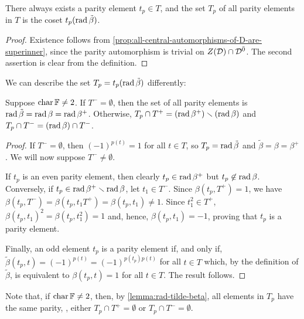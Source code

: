 \begin{cor}\label{cor:existence-parity-element}
    There always exists a parity element $t_p \in T$, and 
    the set $T_p$ of all parity elements in $T$ is the coset $t_p (\operatorname{rad} \tilde\beta)$. 
\end{cor}

\begin{proof}
    Existence follows from \cref{prop:all-central-automorphisms-of-D-are-superinner}, since the parity automorphism is trivial on $Z(\mathcal{D}) \cap \mathcal{D}^{\bar0}$. 
    The second assertion is clear from the definition. 
\end{proof}

We can describe the set $T_p = t_p (\operatorname{rad} \tilde\beta)$ differently: 

\begin{lemma}\label{lemma:set-parity-elements}
    Suppose $\operatorname{char} \mathbb{F} \neq 2$. 
    If $T^- =\emptyset$, then the set of all parity elements is $\operatorname{rad} \tilde\beta = \operatorname{rad} \beta = \operatorname{rad} \beta^+$. 
    Otherwise, $T_p \cap T^+ = (\operatorname{rad} \beta^+) \smallsetminus (\operatorname{rad}\beta)$ and $T_p \cap T^- = (\operatorname{rad} \beta) \cap T^-$. 
\end{lemma}

\begin{proof}
    If $T^- =\emptyset$, then $(-1)^{p(t)} = 1$ for all $t\in T$, so $T_p = \operatorname{rad} \tilde\beta$ and $\tilde\beta = \beta = \beta^+$. 
    We will now suppose $T^- \neq\emptyset$.
    
    If $t_p$ is an even parity element, then clearly $t_p \in \operatorname{rad}\beta^+$ but $t_p \not\in \operatorname{rad} \beta$. 
    Conversely, if $t_p \in \operatorname{rad} \beta^+ \smallsetminus \operatorname{rad}\beta$, let $t_1\in T^-$. 
    Since $\beta(t_p, T^+) = 1$, we have $\beta(t_p, T^-) = \beta(t_p, t_1 T^+) = \beta(t_p, t_1) \neq 1$. 
    Since $t_1^2 \in T^+$, $\beta(t_p, t_1)^2 = \beta(t_p, t_1^2) = 1$ and, hence, $\beta(t_p, t_1) = - 1$, proving that $t_p$ is a parity element. 
    
    Finally, an odd element $t_p$ is a parity element if, and only if, $\tilde\beta(t_p, t) = (-1)^{p(t)} = (-1)^{p(t_p) p(t)}$ for all $t\in T$ which, by the definition of $\tilde\beta$, is equivalent to $\beta(t_p, t) = 1$ for all $t\in T$. 
    The result follows. 
\end{proof} 

Note that, if $\operatorname{char} \mathbb{F} \neq 2$, then, by \cref{lemma:rad-tilde-beta}, all elements in $T_p$ have the same parity, \ie, either $T_p \cap T^+ = \emptyset$ or $T_p \cap T^- = \emptyset$. 

